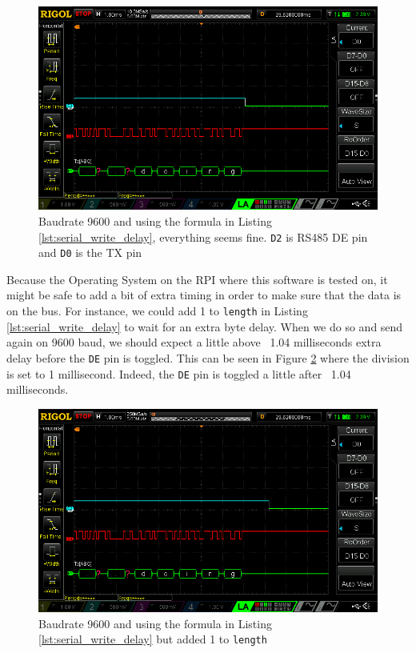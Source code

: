 \begin{figure}[H]
    \includegraphics[scale=0.4]{figures/Scope_No_Extra_Delay.png}
    \caption{Baudrate 9600 and using the formula in Listing \ref{lst:serial_write_delay}, everything seems fine. \texttt{D2} is RS485 DE pin and \texttt{D0} is the TX pin}
    \label{fig:scope_no_extra_delay}
\end{figure}


\newpage
Because the Operating System on the RPI where this software is tested on, it might be safe to add a bit of extra timing in order to make sure that the data is on the bus. For instance, we could add 1 to \texttt{length} in Listing \ref{lst:serial_write_delay} to wait for an extra byte delay.
When we do so and send again on 9600 baud, we should expect a little above ~1.04 milliseconds extra delay before the \texttt{DE} pin is toggled.
This can be seen in Figure \ref{fig:scope_extra_delay9600} where the division is set to 1 millisecond. Indeed, the \texttt{DE} pin is toggled a little after ~1.04 milliseconds.

\begin{figure}[H]
    \includegraphics[scale=0.4]{figures/Scope_Extra_Delay9600.png}
    \caption{Baudrate 9600 and using the formula in Listing \ref{lst:serial_write_delay} but added 1 to \texttt{length}}
    \label{fig:scope_extra_delay9600}
\end{figure}

